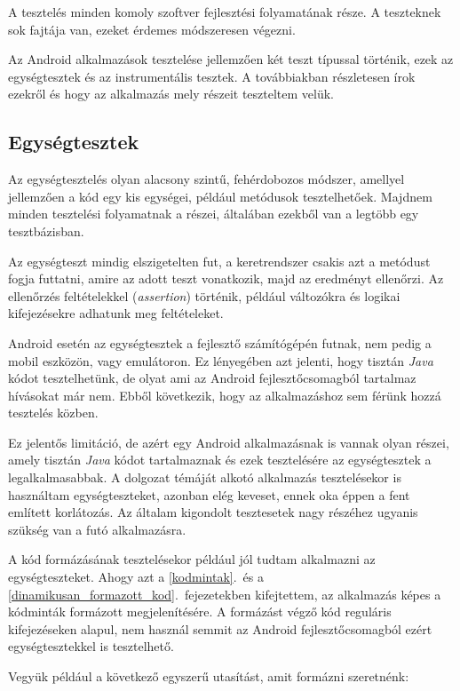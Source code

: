 \documentclass[12pt,a4paper]{article}
\begin{document}
	A tesztelés minden komoly szoftver fejlesztési folyamatának része. A teszteknek sok fajtája van, ezeket érdemes módszeresen végezni. 
	
	Az Android alkalmazások tesztelése jellemzően két teszt típussal történik, ezek az egységtesztek és az instrumentális tesztek. A továbbiakban részletesen írok ezekről és hogy az alkalmazás mely részeit teszteltem velük. 

	\subsection{Egységtesztek}
	
	Az egységtesztelés olyan alacsony szintű, fehérdobozos módszer, amellyel jellemzően a kód egy kis egységei, például metódusok tesztelhetőek. Majdnem minden tesztelési folyamatnak a részei, általában ezekből van a legtöbb egy tesztbázisban.  
	
	Az egységteszt mindig elszigetelten fut, a keretrendszer csakis azt a metódust fogja futtatni, amire az adott teszt vonatkozik, majd az eredményt ellenőrzi. Az ellenőrzés feltételekkel (\textit{assertion}) történik, például változókra és logikai kifejezésekre adhatunk meg feltételeket.
	
	Android esetén az egységtesztek a fejlesztő számítógépén futnak, nem pedig a mobil eszközön, vagy emulátoron. Ez lényegében azt jelenti, hogy tisztán \textit{Java} kódot tesztelhetünk, de olyat ami az Android fejlesztőcsomagból tartalmaz hívásokat már nem. Ebből következik, hogy az alkalmazáshoz sem férünk hozzá tesztelés közben.
	
	Ez jelentős limitáció, de azért egy Android alkalmazásnak is vannak olyan részei, amely tisztán \textit{Java} kódot tartalmaznak és ezek tesztelésére az egységtesztek a legalkalmasabbak. A dolgozat témáját alkotó alkalmazás tesztelésekor is használtam egységteszteket, azonban elég keveset, ennek oka éppen a fent említett korlátozás. Az általam kigondolt tesztesetek nagy részéhez ugyanis szükség van a futó alkalmazásra.
	
	A kód formázásának tesztelésekor például jól tudtam alkalmazni az egységteszteket. Ahogy azt a \ref{kodmintak}.\ és a \ref{dinamikusan_formazott_kod}.\ fejezetekben kifejtettem, az alkalmazás képes a kódminták formázott megjelenítésére. A formázást végző kód reguláris kifejezéseken alapul, nem használ semmit az Android fejlesztőcsomagból ezért egységtesztekkel is tesztelhető.
	
	Vegyük például a következő egyszerű utasítást, amit formázni szeretnénk:
	
\end{document}
